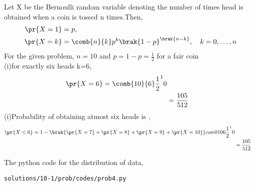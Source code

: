 Let X be the Bernoulli random variable denoting the number of times head is obtained when a coin is tossed n times.Then,
\begin{align}
\pr{X = 1} &= p,
\\
\pr{X = k} &= \comb{n}{k}p^k\brak{1-p}^\brak{n-k}, \quad k = 0,\dots, n
\end{align}
For the given problem, $n = 10$ and $p = 1-p = \frac{1}{2}$ for a fair coin
\\
(i)for exactly six heads k=6,
\begin{align}
\pr{X = 6}= \comb{10}{6}\frac{1}{2}^10
\\
&= \frac{105}{512}
\end{align}
(i)Probability of obtaining atmost six heads is ,
\begin{align}
\pr{X \leq 6}= 1-\brak{\pr{X=7}+\pr{X=8}+\pr{X=9}+\pr{X=10}}
comb{10}{6}\frac{1}{2}^10
\\
&= \frac{105}{512}
\end{align}

The python code for the distribution of data,
\begin{lstlisting}
solutions/10-1/prob/codes/prob4.py
\end{lstlisting}
